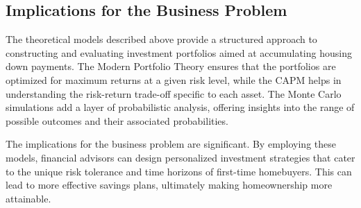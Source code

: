 \subsection{Implications for the Business Problem}
The theoretical models described above provide a structured approach to constructing and evaluating investment portfolios aimed at accumulating housing down payments. The Modern Portfolio Theory ensures that the portfolios are optimized for maximum returns at a given risk level, while the CAPM helps in understanding the risk-return trade-off specific to each asset. The Monte Carlo simulations add a layer of probabilistic analysis, offering insights into the range of possible outcomes and their associated probabilities.

The implications for the business problem are significant. By employing these models, financial advisors can design personalized investment strategies that cater to the unique risk tolerance and time horizons of first-time homebuyers. This can lead to more effective savings plans, ultimately making homeownership more attainable.

